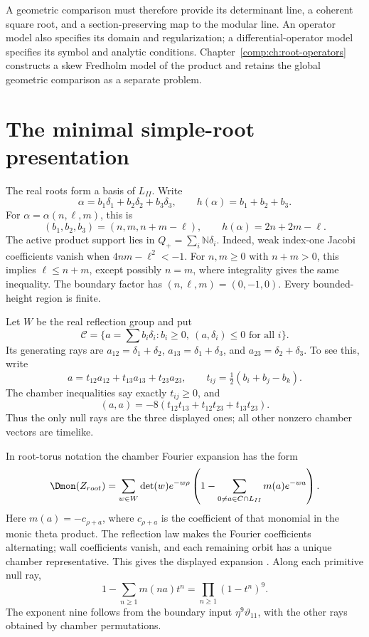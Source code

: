 A geometric comparison must therefore provide its determinant line,
a coherent square root, and a section-preserving map to the modular
line. An operator model also specifies its domain and regularization;
a differential-operator model specifies its symbol and analytic
conditions. Chapter~\ref{comp:ch:root-operators} constructs a skew
Fredholm model of the product and retains the global geometric
comparison as a separate problem.

\section{The minimal simple-root presentation}
The real roots form a basis of \(L_{II}\). Write
\[
 \alpha=b_1\delta_1+b_2\delta_2+b_3\delta_3,
 \qquad h(\alpha)=b_1+b_2+b_3.
\]
For \(\alpha=\alpha(n,\ell,m)\), this is
\[
 (b_1,b_2,b_3)=(n,m,n+m-\ell),\qquad
 h(\alpha)=2n+2m-\ell.
\]
The active product support lies in \(Q_+=\sum_i\mathbb N\delta_i\).
Indeed, weak index-one Jacobi coefficients vanish when
\(4nm-\ell^2<-1\). For \(n,m\geq0\) with \(n+m>0\), this implies
\(\ell\leq n+m\), except possibly \(n=m\), where
integrality gives the same inequality. The boundary factor has
\((n,\ell,m)=(0,-1,0)\). Every bounded-height region is finite.

Let \(W\) be the real reflection group and put
\[
 \mathcal C=\{a=\textstyle\sum b_i\delta_i:
       b_i\geq0,\ (a,\delta_i)\leq0\text{ for all }i\}.
\]
Its generating rays are
\(a_{12}=\delta_1+\delta_2\),
\(a_{13}=\delta_1+\delta_3\), and
\(a_{23}=\delta_2+\delta_3\). To see this, write
\[
 a=t_{12}a_{12}+t_{13}a_{13}+t_{23}a_{23},\qquad
 t_{ij}=\tfrac12(b_i+b_j-b_k).
\]
The chamber inequalities say exactly \(t_{ij}\geq0\), and
\[
 (a,a)=-8(t_{12}t_{13}+t_{12}t_{23}+t_{13}t_{23}).
\]
Thus the only null rays are the three displayed ones; all other
nonzero chamber vectors are timelike.

In root-torus notation the chamber Fourier expansion has the form
\[
 \Dmon(Z_{\mathrm{root}})=\sum_{w\in W}\det(w)e^{-w\rho}
       \left(1-\sum_{0\ne a\in\mathcal C\cap L_{II}}
                         m(a)e^{-wa}\right).
\]
Here \(m(a)=-c_{\rho+a}\), where \(c_{\rho+a}\) is the
coefficient of that monomial in the monic theta product. The
reflection law makes the Fourier coefficients alternating; wall
coefficients vanish, and each remaining orbit has a unique chamber
representative. This gives the displayed expansion
\cite[Theorem~2.3]{GN97}. Along each primitive null ray,
\[
 1-\sum_{n\geq1}m(na)t^n=\prod_{n\geq1}(1-t^n)^9.
\]
The exponent nine follows from the boundary input
\(\eta^9\vartheta_{11}\), with the other rays obtained by
chamber permutations.

